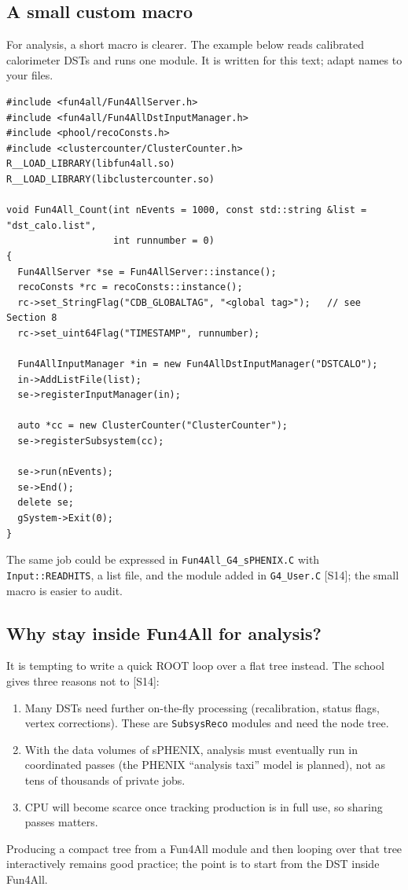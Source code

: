 \documentclass[11pt,letterpaper]{article}
\begin{document}
\subsection{A small custom macro}
For analysis, a short macro is clearer. The example below reads calibrated calorimeter DSTs and runs one module.
It is written for this text; adapt names to your files.
{\footnotesize\begin{verbatim}
#include <fun4all/Fun4AllServer.h>
#include <fun4all/Fun4AllDstInputManager.h>
#include <phool/recoConsts.h>
#include <clustercounter/ClusterCounter.h>
R__LOAD_LIBRARY(libfun4all.so)
R__LOAD_LIBRARY(libclustercounter.so)

void Fun4All_Count(int nEvents = 1000, const std::string &list = "dst_calo.list",
                   int runnumber = 0)
{
  Fun4AllServer *se = Fun4AllServer::instance();
  recoConsts *rc = recoConsts::instance();
  rc->set_StringFlag("CDB_GLOBALTAG", "<global tag>");   // see Section 8
  rc->set_uint64Flag("TIMESTAMP", runnumber);

  Fun4AllInputManager *in = new Fun4AllDstInputManager("DSTCALO");
  in->AddListFile(list);
  se->registerInputManager(in);

  auto *cc = new ClusterCounter("ClusterCounter");
  se->registerSubsystem(cc);

  se->run(nEvents);
  se->End();
  delete se;
  gSystem->Exit(0);
}
\end{verbatim}}
The same job could be expressed in \texttt{Fun4All\_G4\_sPHENIX.C} with \texttt{Input::READHITS}, a list file, and the module added in \texttt{G4\_User.C} [S14]; the small macro is easier to audit.

\subsection{Why stay inside Fun4All for analysis?}
It is tempting to write a quick ROOT loop over a flat tree instead. The school gives three reasons not to [S14]:
\begin{enumerate}
\item Many DSTs need further on-the-fly processing (recalibration, status flags, vertex corrections). These are \texttt{SubsysReco} modules and need the node tree.
\item With the data volumes of sPHENIX, analysis must eventually run in coordinated passes (the PHENIX ``analysis taxi'' model is planned), not as tens of thousands of private jobs.
\item CPU will become scarce once tracking production is in full use, so sharing passes matters.
\end{enumerate}
Producing a compact tree from a Fun4All module and then looping over that tree interactively remains good practice; the point is to start from the DST inside Fun4All.
\end{document}
